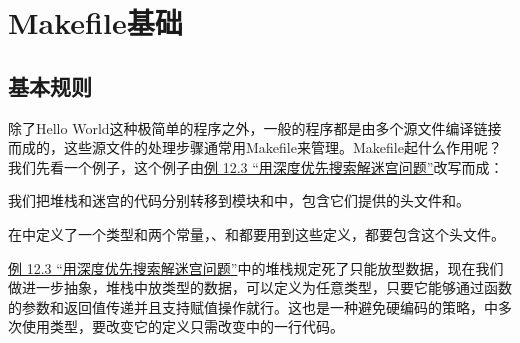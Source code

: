 

\chapter{Makefile基础}
%





\section{基本规则}
%
除了Hello World这种极简单的程序之外，一般的程序都是由多个源文件编译链接而成的，这些源文件的处理步骤通常用Makefile来管理。Makefile起什么作用呢？我们先看一个例子，这个例子由\hyperlink{db.ch12s03.id2750166}{例 12.\BookSplit{}3 “用深度优先搜索解迷宫问题”}改写而成：




我们把堆栈和迷宫的代码分别转移到模块和中，包含它们提供的头文件和。




在中定义了一个类型和两个常量，、和都要用到这些定义，都要包含这个头文件。





\hyperlink{db.ch12s03.id2750166}{例 12.\BookSplit{}3 “用深度优先搜索解迷宫问题”}中的堆栈规定死了只能放型数据，现在我们做进一步抽象，堆栈中放类型的数据，可以定义为任意类型，只要它能够通过函数的参数和返回值传递并且支持赋值操作就行。这也是一种避免硬编码的策略，中多次使用类型，要改变它的定义只需改变中的一行代码。


